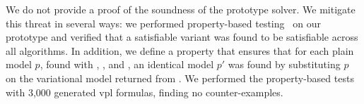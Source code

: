 We do not provide a proof of the soundness of the prototype solver. We mitigate
this threat in several ways: we performed property-based
testing~\cite{quickcheck} on our prototype and verified that a satisfiable
variant was found to be satisfiable across all algorithms. In addition, we
define a property that ensures that for each plain model $p$, found with
\pTov{}, \vTop{}, and \pTop{}, an identical model $p'$ was found by substituting
$p$ on the variational model returned from \vsat{}. We performed the
property-based tests with 3,000 generated \ac{vpl} formulas, finding no
counter-examples.



